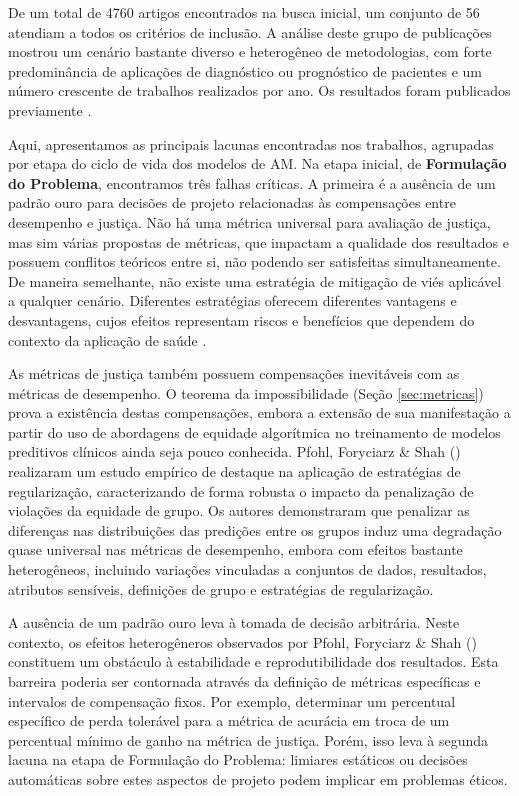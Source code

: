 De um total de 4760 artigos encontrados na busca inicial, um conjunto de 56 atendiam a todos os critérios de inclusão. A análise deste grupo de publicações mostrou um cenário bastante diverso e heterogêneo de metodologias, com forte predominância de aplicações de diagnóstico ou prognóstico de pacientes e um número crescente de trabalhos realizados por ano. Os resultados foram publicados previamente
\cite{de2025justicca}.

Aqui, apresentamos as principais lacunas encontradas nos trabalhos, agrupadas por etapa do ciclo de vida dos modelos de AM. Na etapa inicial, de \textbf{Formulação do Problema}, encontramos três falhas críticas. A primeira é a ausência de um padrão ouro para decisões de projeto relacionadas às compensações entre desempenho e justiça. Não há uma métrica universal para avaliação de justiça, mas sim várias propostas de métricas, que impactam a qualidade dos resultados e possuem conflitos teóricos entre si, não podendo ser satisfeitas simultaneamente. De maneira semelhante, não existe uma estratégia de mitigação de viés aplicável a qualquer cenário. Diferentes estratégias oferecem diferentes vantagens e desvantagens, cujos efeitos representam riscos e benefícios que dependem do contexto da aplicação de saúde  \cite{alday2022age,mosteiro2022bias,park2021comparison,yuan2021assessing}.

As métricas de justiça também possuem compensações inevitáveis com as métricas de desempenho. O teorema da impossibilidade (Seção \ref{sec:metricas}) prova a existência destas compensações, embora a extensão de sua manifestação a partir do uso de abordagens de equidade algorítmica no treinamento de modelos preditivos clínicos ainda seja pouco conhecida. Pfohl, Foryciarz \& Shah (\citeyear{pfohl2021empirical}) realizaram um estudo empírico de destaque na aplicação de estratégias de regularização, caracterizando de forma robusta o impacto da penalização de violações da equidade de grupo. Os autores demonstraram que penalizar as diferenças nas distribuições das predições entre os grupos induz uma degradação quase universal nas métricas de desempenho, embora com efeitos bastante heterogêneos, incluindo variações vinculadas a conjuntos de dados, resultados, atributos sensíveis, definições de grupo e estratégias de regularização.

A ausência de um padrão ouro leva à tomada de decisão arbitrária. Neste contexto, os efeitos heterogêneros observados por Pfohl, Foryciarz \& Shah (\citeyear{pfohl2021empirical}) constituem um obstáculo à estabilidade e reprodutibilidade dos resultados. Esta barreira poderia ser contornada através da definição de métricas específicas e intervalos de compensação fixos. Por exemplo, determinar um percentual específico de perda tolerável para a métrica de acurácia em troca de um percentual mínimo de ganho na métrica de justiça. Porém, isso leva à segunda lacuna na etapa de Formulação do Problema: limiares estáticos ou decisões automáticas sobre estes aspectos de projeto podem implicar em problemas éticos.

